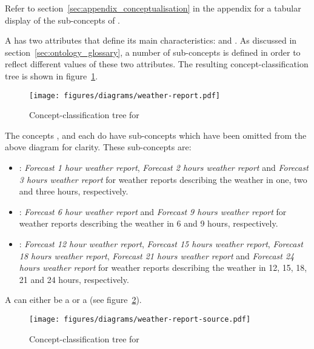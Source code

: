 Refer to section~\ref{sec:appendix_conceptualisation} in the appendix for a tabular display of the sub-concepts of .

A  has two attributes that define its main characteristics:  and . As discussed in section~\ref{sec:ontology_glossary}, a number of sub-concepts is defined in order to reflect different values of these two attributes. The resulting concept-classification tree is shown in figure~\ref{fig:tree_weather_report}.

\begin{figure}
  \centering
  \texttt{[image: figures/diagrams/weather-report.pdf]}
  \caption{Concept-classification tree for }
  \label{fig:tree_weather_report}
\end{figure}

The concepts ,  and  each do have sub-concepts which have been omitted from the above diagram for clarity. These sub-concepts are:
\begin{itemize}
  \item {}: \emph{Forecast 1 hour weather report}, \emph{Forecast 2 hours weather report} and \emph{Forecast 3 hours weather report} for weather reports describing the weather in one, two and three hours, respectively.
  \item {}: \emph{Forecast 6 hour weather report} and \emph{Forecast 9 hours weather report} for weather reports describing the weather in 6 and 9 hours, respectively.
  \item {}: \emph{Forecast 12 hour weather report}, \emph{Forecast 15 hours weather report}, \emph{Forecast 18 hours weather report}, \emph{Forecast 21 hours weather report} and \emph{Forecast 24 hours weather report} for weather reports describing the weather in 12, 15, 18, 21 and 24 hours, respectively.
\end{itemize}

A  can either be a  or a  (see figure~\ref{fig:tree_weather_source}).

\begin{figure}
  \centering
  \texttt{[image: figures/diagrams/weather-report-source.pdf]}
  \caption{Concept-classification tree for }
  \label{fig:tree_weather_source}
\end{figure}

